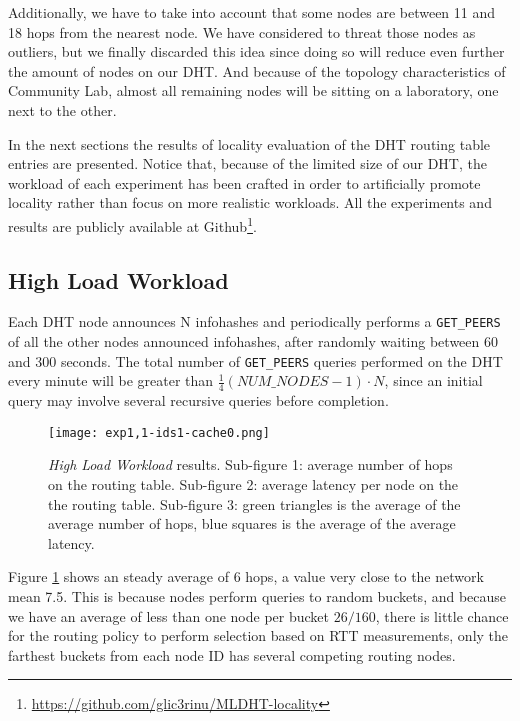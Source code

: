 \documentclass[conference]{IEEEtran}
\begin{document}
Additionally, we have to take into account that some nodes are between 11 and 18 hops from the nearest node. We have considered to threat those nodes as outliers, but we finally discarded this idea since doing so will reduce even further the amount of nodes on our DHT. And because of the topology characteristics of Community Lab, almost all remaining nodes will be sitting on a laboratory, one next to the other.

In the next sections the results of locality evaluation of the DHT routing table entries are presented. Notice that, because of the limited size of our DHT, the workload of each experiment has been crafted in order to artificially promote locality rather than focus on more realistic workloads. All the experiments and results are publicly available at Github\footnote{\url{https://github.com/glic3rinu/MLDHT-locality}}.


\subsection{High Load Workload}

Each DHT node announces N infohashes and periodically performs a \texttt{GET\_PEERS} of all the other nodes announced infohashes, after randomly waiting between 60 and 300 seconds. The total number of \texttt{GET\_PEERS} queries performed on the DHT every minute will be greater than $\frac{1}{4} (NUM\_NODES-1) \cdot N$, since an initial query may involve several recursive queries before completion.

\begin{figure}
    \texttt{[image: exp1,1-ids1-cache0.png]}
    \caption{\textit{High Load Workload} results. Sub-figure 1: average number of hops on the routing table. Sub-figure 2: average latency per node on the the routing table. Sub-figure 3: green triangles is the average of the average number of hops, blue squares is the average of the average latency.}
    \label{fig:exp1,1-ids1-cache0}
\end{figure}

Figure \ref{fig:exp1,1-ids1-cache0} shows an steady average of 6 hops, a value very close to the network mean 7.5. This is because nodes perform queries to random buckets, and because we have an average of less than one node per bucket $26/160$, there is little chance for the routing policy to perform selection based on RTT measurements, only the farthest buckets from each node ID has several competing routing nodes.
\end{document}
